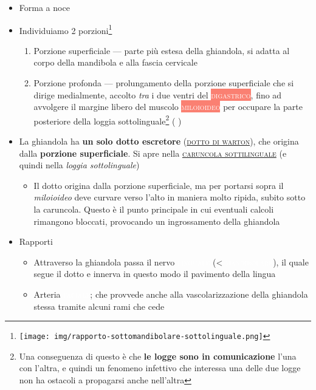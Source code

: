 \documentclass[italian,]{article}
\providecommand{\tightlist}{%
  \setlength{\itemsep}{0pt}\setlength{\parskip}{0pt}}
\newcommand{\mus}[1]{\colorbox{Salmon}{\textcolor{white}{\textsc{#1}}}}
\newcommand{\art}[1]{\colorbox{RedOrange}{\textcolor{white}{\textsc{#1}}}}
\newcommand{\ner}[1]{\colorbox{Dandelion}{\textcolor{white}{\textsc{#1}}}}
\renewcommand{\a}[1]{\underline{\textsc{#1}}}
\newcommand{\nnetter}[1]{ \fbox{\textsf{Netter (2018), plate #1}} }
\begin{document}
\begin{itemize}
\tightlist
\item
  Forma a noce
\item
  Individuiamo 2 porzioni\footnote{\texttt{[image: img/rapporto-sottomandibolare-sottolinguale.png]}}

  \begin{enumerate}
  \def\labelenumi{\arabic{enumi}.}
  \tightlist
  \item
    Porzione superficiale --- parte più estesa della ghiandola, si
    adatta al corpo della mandibola e alla fascia cervicale
  \item
    Porzione profonda --- prolungamento della porzione superficiale che
    si dirige medialmente, accolto \emph{tra} i due ventri del
    \mus{digastrico}, fino ad avvolgere il margine libero del muscolo
    \mus{miloioideo} per occupare la parte posteriore della loggia
    sottolinguale\footnote{Una conseguenza di questo è che \textbf{le
      logge sono in comunicazione} l'una con l'altra, e quindi un
      fenomeno infettivo che interessa una delle due logge non ha
      ostacoli a propagarsi anche nell'altra} (\nnetter{69B})
  \end{enumerate}
\item
  La ghiandola ha \textbf{un solo dotto escretore}
  (\a{dotto di warton}), che origina dalla \textbf{porzione
  superficiale}. Si apre nella \a{caruncola sottilinguale} (e quindi
  nella \emph{loggia sottolinguale})

  \begin{itemize}
  \tightlist
  \item
    Il dotto origina dalla porzione superficiale, ma per portarsi sopra
    il \emph{miloioideo} deve curvare verso l'alto in maniera molto
    ripida, subito sotto la caruncola. Questo è il punto principale in
    cui eventuali calcoli rimangono bloccati, provocando un
    ingrossamento della ghiandola
  \end{itemize}
\item
  Rapporti

  \begin{itemize}
  \tightlist
  \item
    Attraverso la ghiandola passa il nervo \ner{linguale} (\textless{}
    \ner{mandibolare}), il quale segue il dotto e innerva in questo modo
    il pavimento della lingua
  \item
    Arteria \art{faciale}; che provvede anche alla vascolarizzazione
    della ghiandola stessa tramite alcuni rami che cede
  \end{itemize}
\end{itemize}
\end{document}

